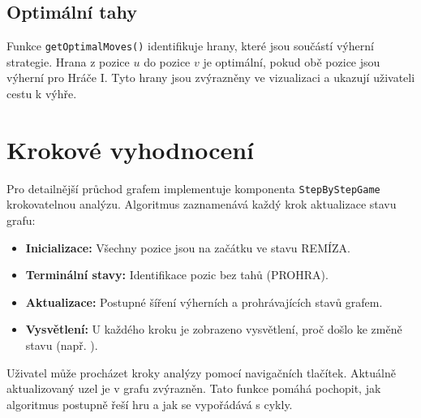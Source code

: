 \subsection{Optimální tahy}
\label{sec:GamesOptimalMoves}

Funkce \texttt{getOptimalMoves()} identifikuje hrany, které jsou součástí výherní strategie. Hrana z pozice \( u \) do pozice \( v \) je optimální, pokud obě pozice jsou výherní pro Hráče I. Tyto hrany jsou zvýrazněny ve vizualizaci a ukazují uživateli cestu k výhře.

\section{Krokové vyhodnocení}
\label{sec:GamesStepByStep}

Pro detailnější průchod grafem implementuje komponenta \texttt{StepByStepGame} krokovatelnou analýzu. Algoritmus zaznamenává každý krok aktualizace stavu grafu:

\begin{itemize}
    \item \textbf{Inicializace:} Všechny pozice jsou na začátku ve stavu REMÍZA.
    \item \textbf{Terminální stavy:} Identifikace pozic bez tahů (PROHRA).
    \item \textbf{Aktualizace:} Postupné šíření výherních a prohrávajících stavů grafem.
    \item \textbf{Vysvětlení:} U každého kroku je zobrazeno vysvětlení, proč došlo ke změně stavu (např. ).
\end{itemize}

Uživatel může procházet kroky analýzy pomocí navigačních tlačítek. Aktuálně aktualizovaný uzel je v grafu zvýrazněn. Tato funkce pomáhá pochopit, jak algoritmus postupně řeší hru a jak se vypořádává s cykly.

